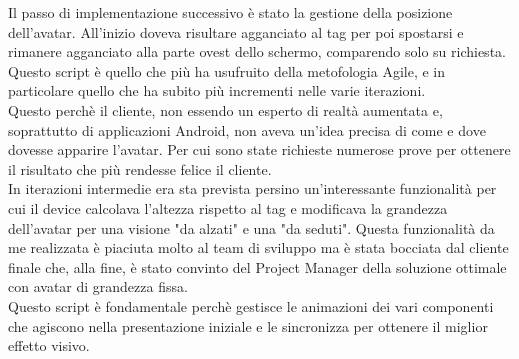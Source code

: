 Il passo di implementazione successivo \`e stato la gestione della posizione dell'avatar. All'inizio doveva risultare agganciato al tag per poi spostarsi e rimanere agganciato alla parte ovest dello schermo, comparendo solo su richiesta.\\
Questo script \`e quello che pi\`u ha usufruito della metofologia Agile, e in particolare quello che ha subito pi\`u incrementi nelle varie iterazioni.\\
Questo perch\`e il cliente, non essendo un esperto di realt\`a aumentata e, soprattutto di applicazioni Android, non aveva un'idea precisa di come e dove dovesse apparire l'avatar. Per cui sono state richieste numerose prove per ottenere il risultato che pi\`u rendesse felice il cliente.\\
In iterazioni intermedie era sta prevista persino un'interessante funzionalit\`a per cui il device calcolava l'altezza rispetto al tag e modificava la grandezza dell'avatar per una visione "da alzati" e una "da seduti". Questa funzionalit\`a da me realizzata \`e piaciuta molto al team di sviluppo ma \`e stata bocciata dal cliente finale che, alla fine, \`e stato convinto del Project Manager della soluzione ottimale con avatar di grandezza fissa.\\
Questo script \`e fondamentale perch\`e gestisce le animazioni dei vari componenti che agiscono nella presentazione iniziale e le sincronizza per ottenere il miglior effetto visivo.\\\\

